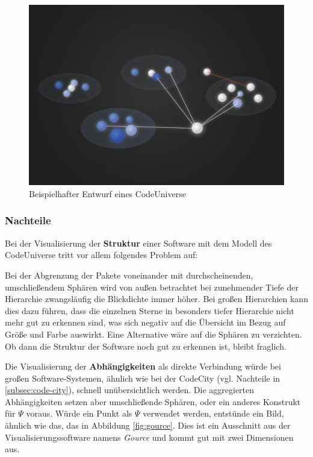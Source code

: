 \begin{figure}[htbp]
	\centering
	\includegraphics[width=\linewidth]{figures/code-universe}
	\caption{Beispielhafter Entwurf eines CodeUniverse} \label{fig:code-universe}
\end{figure}

\subsubsection*{Nachteile}
Bei der Visualisierung der \textbf{Struktur} einer Software mit dem Modell des CodeUniverse tritt vor allem folgendes Problem auf:

Bei der Abgrenzung der Pakete voneinander mit durchscheinenden, umschließendem Sphären wird von außen betrachtet bei zunehmender Tiefe der Hierarchie zwangsläufig die Blickdichte immer höher. Bei großen Hierarchien kann dies dazu führen, dass die einzelnen Sterne in besonders tiefer Hierarchie nicht mehr gut zu erkennen sind, was sich negativ auf die Übersicht im Bezug auf Größe und Farbe auswirkt. Eine Alternative wäre auf die Sphären zu verzichten. Ob dann die Struktur der Software noch gut zu erkennen ist, bleibt fraglich.

Die Visualisierung der \textbf{Abhängigkeiten} als direkte Verbindung würde bei großen Software-Systemen, ähnlich wie bei der CodeCity (vgl. Nachteile in \ref{subsec:code-city}), schnell unübersichtlich werden. Die aggregierten Abhängigkeiten setzen aber umschließende Sphären, oder ein anderes Konstrukt für $\Psi$ voraus. Würde ein Punkt als $\Psi$ verwendet werden, entstünde ein Bild, ähnlich wie das, das in Abbildung \ref{fig:gource}. Dies ist ein Ausschnitt aus der Visualisierungssoftware namens \textit{Gource} und kommt gut mit zwei Dimensionen aus. 

